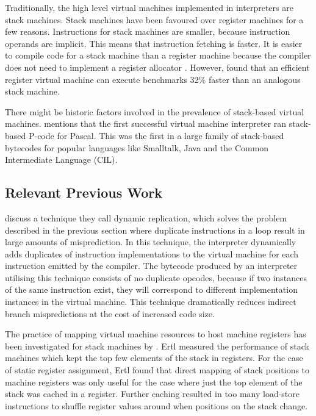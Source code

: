 		Traditionally, the high level virtual machines implemented in interpreters are stack machines. Stack machines have been favoured over register machines for a few reasons. Instructions for stack machines are smaller, because instruction operands are implicit. This means that instruction fetching is faster. It is easier to compile code for a stack machine than a register machine because the compiler does not need to implement a register allocator \citep{caseregistervm}. However, \cite{stackregistershowdown} found that an efficient register virtual machine can execute benchmarks 32\% faster than an analogous stack machine. 
		
		There might be historic factors involved in the prevalence of stack-based virtual machines. \cite{caseregistervm} mentions that the first successful virtual machine interpreter ran stack-based P-code for Pascal. This was the first in a large family of stack-based bytecodes for popular languages like Smalltalk, Java and the Common Intermediate Language (CIL).
		
		\subsection{Relevant Previous Work}
		\cite{optimizingindirectbranch} discuss a technique they call dynamic replication, which solves the problem described in the previous section where duplicate instructions in a loop result in large amounts of misprediction. In this technique, the interpreter dynamically adds duplicates of instruction implementations to the virtual machine for each instruction emitted by the compiler. The bytecode produced by an interpreter utilising this technique consists of no duplicate opcodes, because if two instances of the same instruction exist, they will correspond to different implementation instances in the virtual machine. This technique dramatically reduces indirect branch mispredictions at the cost of increased code size.
		
		The practice of mapping virtual machine resources to host machine registers has been investigated for stack machines by \cite{stackcaching}. Ertl measured the performance of stack machines which kept the top few elements of the stack in registers. For the case of static register assignment, Ertl found that direct mapping of stack positions to machine registers was only useful for the case where just the top element of the stack was cached in a register. Further caching resulted in too many load-store instructions to shuffle register values around when positions on the stack change.
		
